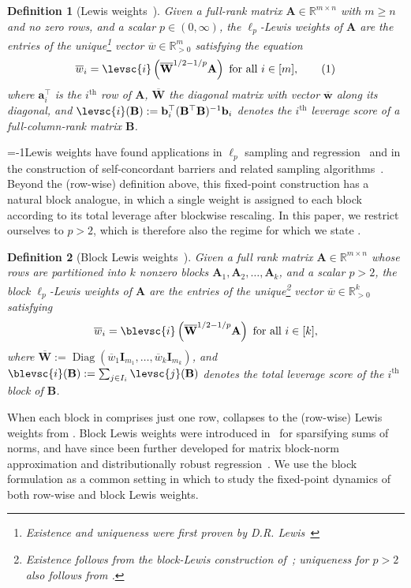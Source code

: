 \documentclass[11pt]{article}
\newcommand\numberthis{\addtocounter{equation}{1}\tag{\theequation}}
\theoremstyle{plain}
\newtheorem{definition}[definition]{Definition}
\numberwithin{equation}{section}
\newcommand{\R}{\mathbb{R}}
\newcommand{\Diag}{\operatorname{Diag}}
\newcommand{\Rmspos}{\mathbb{R}^m_{>0}}
\newcommand{\Rkpos}{\mathbb{R}_{>0}^k}
\newcommand{\bA}{\mathbf{A}}
\newcommand{\bB}{\mathbf{B}}
\newcommand{\bI}{\mathbf{I}}
\newcommand{\ba}{\mathbf{a}}
\newcommand{\bb}{\mathbf{b}}
\newcommand{\bwbar}{\overline{\mathbf{w}}}
\newcommand{\wbar}{\overline{w}}
\newcommand{\Wbar}{\overline{\mathbf{W}}}
\newcommand{\bWbar}{\overline{\mathbf{W}}}
\begin{document}
\begin{definition}[Lewis weights~\cite{lewis1978finite,cohen2015lp}]\label{def:LW}
Given a full-rank matrix $\bA\in\R^{m\times n}$ with $m\geq n$ and no zero rows, and a scalar $p\in(0,\infty)$, the $\ell_p$-Lewis weights of $\bA$ are the entries of the unique\footnote{Existence and uniqueness were first proven by D.R. Lewis~\cite{lewis1978finite}} vector $\wbar\in\Rmspos$ satisfying the equation
\[
\wbar_i=\levsc{i}\left(\Wbar^{1/2-1/p}\bA\right)
\text{ for all }i\in[m], \numberthis\label{eq:Lewis-fixed-point}
\]
where $\ba_i^\top$ is the $i^\mathrm{th}$ row of $\bA$, $\Wbar$ the diagonal matrix with vector $\bwbar$ along its diagonal, and $\levsc{i}(\bB):=\bb_i^\top(\bB^\top\bB)^{-1}\bb_i$ denotes the $i^\mathrm{th}$ leverage score of a full-column-rank matrix $\bB$. 
\end{definition}

\looseness=-1Lewis weights have found applications in $\ell_p$ sampling and regression~\cite{cohen2015lp,musco2022active} and in the construction of self-concordant barriers and related sampling algorithms~\cite{lee2019solving,laddha2020strong}.
Beyond the (row-wise) definition above, this fixed-point construction has a natural block analogue, in which a single weight is assigned to each block according to its total leverage after blockwise rescaling.
In this paper, we restrict ourselves to $p>2$, which is therefore also the regime for which we state .
\begin{definition}[Block Lewis weights~\cite{jambulapati2023sparsifying}]\label{def:blockLW} 
Given a full rank matrix $\bA\in\R^{m \times n}$ whose rows are partitioned into $k$ nonzero blocks $\bA_1, \bA_2, \dotsc, \bA_k$, and a scalar $p >2$, the block $\ell_p$-Lewis weights of $\bA$ are the entries of the  unique\footnote{Existence follows from the block-Lewis construction of~\cite{jambulapati2023sparsifying}; uniqueness for $p>2$ also follows from .}
 vector $\wbar\in\Rkpos$ satisfying \[\wbar_i = \blevsc{i}\left(\Wbar^{1/2-1/p}\bA\right) \text{ for all } i \in [k],\] where $\bWbar:=\Diag(\wbar_1\bI_{m_1},\dotsc,\wbar_k\bI_{m_k})$, and
$
\blevsc{i}(\bB)
:=
\sum_{j \in I_i}\levsc{j}(\bB)
$
denotes the total leverage score of the $i^\mathrm{th}$ block of $\bB$.
\end{definition} 

When each block in  comprises just one row,  collapses to the (row-wise) Lewis weights from . 
Block Lewis weights were introduced in~\cite{jambulapati2023sparsifying} for sparsifying sums of norms, and have since been further developed for matrix block-norm approximation and distributionally robust regression~\cite{manoj2025change,manoj2026distributionally}.
We use the block formulation as a common setting in which to study the fixed-point dynamics of both row-wise and block Lewis weights.
\end{document}
